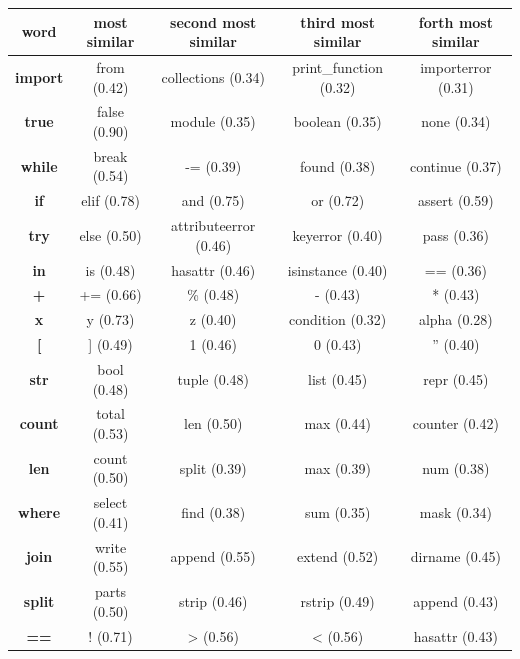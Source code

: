 \documentclass[
a4paper,
pagesize,
pdftex,
12pt,
twoside, %
BCOR=5mm, %
ngerman,
fleqn,
final,
]{scrartcl}
\begin{document}
	\footnotesize
	\begin{center}
		\begin{tabular}{ |c|c|c|c|c| } 
			\hline
			\textbf{word} & \textbf{ most similar} &\textbf{ second most similar} & \textbf{third most similar}& \textbf{forth most similar}\\ 
			\hline
			\textbf{import} & from (0.42) & collections (0.34) & print\_function (0.32) & importerror (0.31)\\ 
			\textbf{true} & false (0.90) & module (0.35) & boolean (0.35) & none (0.34)\\  
			\textbf{while} & break (0.54)  & -= (0.39) & found (0.38) & continue (0.37) \\
			\textbf{if} & elif (0.78)  & and (0.75) & or (0.72) & assert (0.59) \\
			\textbf{try} & else (0.50)  & attributeerror (0.46) & keyerror (0.40) & pass (0.36) \\
			\textbf{in} & is (0.48)  & hasattr (0.46) & isinstance (0.40) & == (0.36) \\
			\textbf{+} & += (0.66)  & \% (0.48) & - (0.43) & * (0.43) \\
			\textbf{x} & y (0.73)  & z (0.40) & condition (0.32) & alpha (0.28) \\
			\textbf{[} & ] (0.49)  & 1 (0.46) & 0 (0.43) & '' (0.40) \\
			\textbf{str} & bool (0.48)  & tuple (0.48) & list (0.45) & repr (0.45) \\
			\textbf{count} & total (0.53)  & len (0.50) & max (0.44) & counter (0.42) \\
			\textbf{len} & count (0.50)  & split (0.39) & max (0.39) & num (0.38) \\
			\textbf{where} & select (0.41)  & find (0.38) & sum (0.35) & mask (0.34) \\
			\textbf{join} & write (0.55)  & append (0.55) & extend (0.52) & dirname (0.45) \\
			\textbf{split} & parts (0.50)  & strip (0.46) & rstrip (0.49) & append (0.43) \\
			\textbf{==} & ! (0.71)  & > (0.56) & < (0.56) & hasattr (0.43) \\
			\hline
		\end{tabular}
	\end{center}
	\normalsize
	
\end{document}
